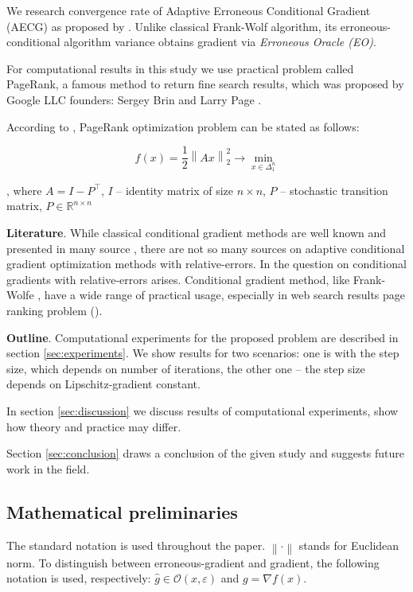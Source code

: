\documentclass[runningheads, final]{llncs}
\newcommand{\norm}[1]{\left\lVert#1\right\rVert}
\newcommand{\errgrad}{\hat{g}}
\begin{document}
We research convergence rate of Adaptive Erroneous Conditional Gradient (AECG)
as proposed by \cite{hallak:2024}.
Unlike classical Frank-Wolf algorithm, its erroneous-conditional algorithm
variance obtains gradient via \textit{Erroneous Oracle (EO)}.

For computational results in this study we use practical problem called
PageRank, a famous method to return fine search results, which was proposed by
Google LLC founders: Sergey Brin and Larry Page \cite{brin:2012}.

According to \cite{anikin:2022}, PageRank optimization problem can be stated
as follows:

\begin{equation}
    f(x) = \frac{1}{2}\norm{Ax}_2^2 \to \min_{x\in\Delta^n_{1}}
\end{equation}

, where $A = I - P^\intercal$, $I$ -- identity matrix of size $n\times n$,
$P$ -- stochastic transition matrix, $P \in \mathbb{R}^{n\times n}$

\textbf{Literature}. While classical conditional gradient methods are well known
and presented in many source \cite{dvurechensky:2015,dvurechensky:2017}, there
are not so many sources on adaptive conditional gradient optimization methods
with relative-errors. In \cite{hallak:2024} the question on conditional
gradients with relative-errors arises. Conditional gradient method,
like Frank-Wolfe \cite{frankwolfe:1956}, have a wide range of practical usage,
especially in web search results page ranking problem (\cite{anikin:2022}).

\textbf{Outline}. Computational experiments for the proposed problem are
described in section \ref{sec:experiments}. We show results for two scenarios:
one is with the step size, which depends on number of iterations, the other one
-- the step size depends on Lipschitz-gradient constant.

In section \ref{sec:discussion} we discuss results of computational experiments,
show how theory and practice may differ.

Section \ref{sec:conclusion} draws a conclusion of the given study and suggests
future work in the field.

\subsection{Mathematical preliminaries}

The standard notation is used throughout the paper. $\norm{\cdot}$ stands for
Euclidean norm. To distinguish between erroneous-gradient and gradient, the
following notation is used, respectively:
$\errgrad \in \mathcal{O}(x, \varepsilon)$ and $g = \nabla f(x)$.
\end{document}
